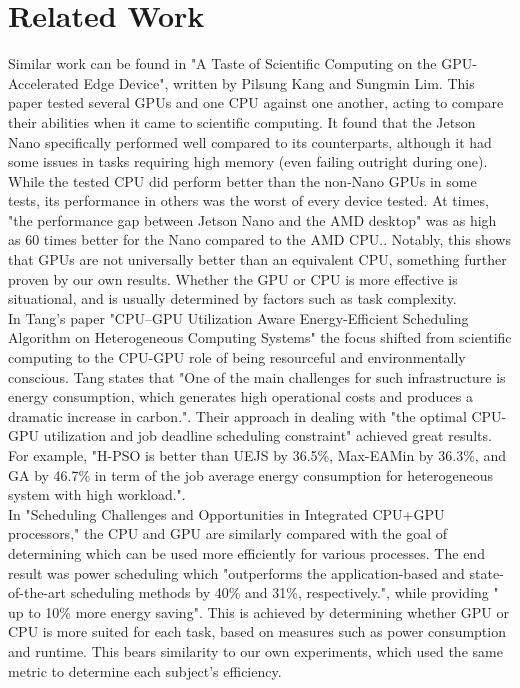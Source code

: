 \documentclass[conference]{IEEEtran}
\begin{document}
\section{Related Work}
Similar work can be found in "A Taste of Scientific Computing on the GPU-Accelerated Edge Device", written by Pilsung Kang and Sungmin Lim. This paper tested several GPUs and one CPU against one another, acting to compare their abilities when it came to scientific computing. It found that the Jetson Nano specifically performed well compared to its counterparts, although it had some issues in tasks requiring high memory (even failing outright during one). While the tested CPU did perform better than the non-Nano GPUs in some tests, its performance in others was the worst of every device tested. At times, "the performance gap between Jetson Nano and the AMD desktop" was as high as 60 times better for the Nano compared to the AMD CPU.\cite{Kang}. Notably, this shows that GPUs are not universally better than an equivalent CPU, something further proven by our own results. Whether the GPU or CPU is more effective is situational, and is usually determined by factors such as task complexity.\\
In Tang's paper "CPU–GPU Utilization Aware Energy-Efficient Scheduling Algorithm on Heterogeneous Computing Systems" the focus shifted from scientific computing to the CPU-GPU role of being resourceful and environmentally conscious. Tang states that "One of the main challenges for such infrastructure is energy consumption, which generates high operational costs and produces a dramatic increase in carbon."\cite{Tang}. Their approach in dealing with "the optimal CPU-GPU utilization and job deadline scheduling constraint" achieved great results\cite{Tang}. For example, "H-PSO is better than UEJS by 36.5\%, Max-EAMin by 36.3\%, and GA by 46.7\% in term of the job average energy consumption for heterogeneous system with high workload."\cite{Tang}.\\
In "Scheduling Challenges and Opportunities in Integrated CPU+GPU processors," the CPU and GPU are similarly compared with the goal of determining which can be used more efficiently for various processes. The end result was power scheduling which "outperforms the application-based and state-of-the-art scheduling methods by 40\% and 31\%, respectively.", while providing " up to 10\% more energy saving"\cite{Dev}. This is achieved by determining whether GPU or CPU is more suited for each task, based on measures such as power consumption and runtime. This bears similarity to our own experiments, which used the same metric to determine each subject's efficiency.\\
\end{document}
